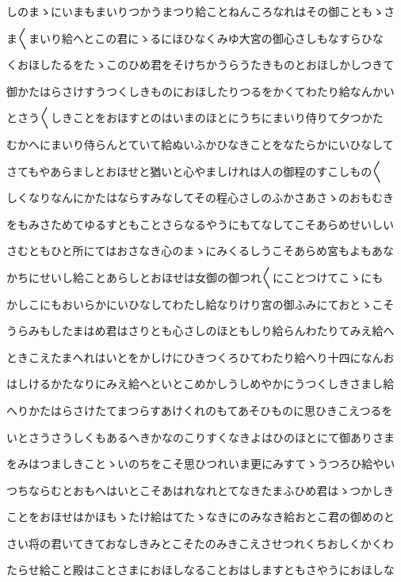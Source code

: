 \documentclass[a4paper,11pt,landscape]{ltjtarticle}
\begin{document}
しのまゝにいまもまいりつかうまつり給ことねんころなれはその御こともゝさ
\par\medskip
ま〱まいり給へとこの君にゝるにほひなくみゆ大宮の御心さしもなすらひな
\par\medskip
くおほしたるをたゝこのひめ君をそけちかうらうたきものとおほしかしつきて
\par\medskip
御かたはらさけすうつくしきものにおほしたりつるをかくてわたり給なんかい
\par\medskip
とさう〱しきことをおほすとのはいまのほとにうちにまいり侍りて夕つかた
\par\medskip
むかへにまいり侍らんとていて給ぬいふかひなきことをなたらかにいひなして
\par\medskip
さてもやあらましとおほせと猶いと心やましけれは人の御程のすこしもの〱
\par\medskip
しくなりなんにかたはならすみなしてその程心さしのふかさあさゝのおもむき
\par\medskip
をもみさためてゆるすともことさらなるやうにもてなしてこそあらめせいしい
\par\medskip
さむともひと所にてはおさなき心のまゝにみくるしうこそあらめ宮もよもあな
\par\medskip
かちにせいし給ことあらしとおほせは女御の御つれ〱にことつけてこゝにも
\par\medskip
かしこにもおいらかにいひなしてわたし給なりけり宮の御ふみにておとゝこそ
\par\medskip
うらみもしたまはめ君はさりとも心さしのほともしり給らんわたりてみえ給へ
\par\medskip
ときこえたまへれはいとをかしけにひきつくろひてわたり給へり十四になんお
\par\medskip
はしけるかたなりにみえ給へといとこめかしうしめやかにうつくしきさまし給
\par\medskip
へりかたはらさけたてまつらすあけくれのもてあそひものに思ひきこえつるを
\par\medskip
いとさうさうしくもあるへきかなのこりすくなきよはひのほとにて御ありさま
\par\medskip
をみはつましきことゝいのちをこそ思ひつれいま更にみすてゝうつろひ給やい
\par\medskip
つちならむとおもへはいとこそあはれなれとてなきたまふひめ君はゝつかしき
\par\medskip
ことをおほせはかほもゝたけ給はてたゝなきにのみなき給おとこ君の御めのと
\par\medskip
さい将の君いてきておなしきみとこそたのみきこえさせつれくちおしくかくわ
\par\medskip
たらせ給こと殿はことさまにおほしなることおはしますともさやうにおほしな
\end{document}

